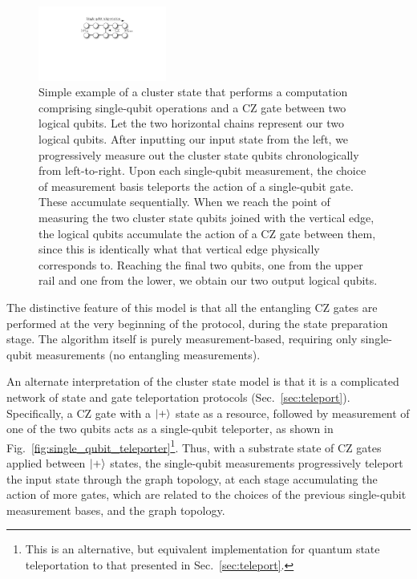\begin{figure}[!htb]
	\includegraphics[width=0.375\textwidth]{cluster_state_circuit}
	\caption{Simple example of a cluster state that performs a computation comprising single-qubit operations and a CZ gate between two logical qubits. Let the two horizontal chains represent our two logical qubits. After inputting our input state from the left, we progressively measure out the cluster state qubits chronologically from left-to-right. Upon each single-qubit measurement, the choice of measurement basis teleports the action of a single-qubit gate. These accumulate sequentially. When we reach the point of measuring the two cluster state qubits joined with the vertical edge, the logical qubits accumulate the action of a CZ gate between them, since this is identically what that vertical edge physically corresponds to. Reaching the final two qubits, one from the upper rail and one from the lower, we obtain our two output logical qubits.} \label{fig:cluster_state_circuit}
\end{figure}

The distinctive feature of this model is that all the entangling CZ gates are performed at the very beginning of the protocol, during the state preparation stage. The algorithm itself is purely measurement-based, requiring only single-qubit measurements (no entangling measurements).

An alternate interpretation of the cluster state model is that it is a complicated network of state and gate teleportation protocols (Sec.~\ref{sec:teleport}). Specifically, a CZ gate with a $|+\rangle$ state as a resource, followed by measurement of one of the two qubits acts as a single-qubit teleporter, as shown in Fig.~\ref{fig:single_qubit_teleporter}\footnote{This is an alternative, but equivalent implementation for quantum state teleportation to that presented in Sec.~\ref{sec:teleport}.}. Thus, with a substrate state of CZ gates applied between $|+\rangle$ states, the single-qubit measurements progressively teleport the input state through the graph topology, at each stage accumulating the action of more gates, which are related to the choices of the previous single-qubit measurement bases, and the graph topology.

